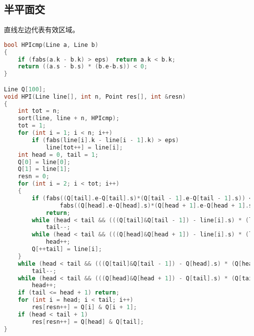 \subsection{半平面交}
	直线左边代表有效区域。
	\begin{lstlisting}[language=c++]
bool HPIcmp(Line a, Line b)
{
	if (fabs(a.k - b.k) > eps)	return a.k < b.k;
	return ((a.s - b.s) * (b.e-b.s)) < 0;
}

Line Q[100];
void HPI(Line line[], int n, Point res[], int &resn)
{
	int tot = n;
	sort(line, line + n, HPIcmp);
	tot = 1;
	for (int i = 1; i < n; i++)
		if (fabs(line[i].k - line[i - 1].k) > eps)
			line[tot++] = line[i];
	int head = 0, tail = 1;
	Q[0] = line[0];
	Q[1] = line[1];
	resn = 0;
	for (int i = 2; i < tot; i++)
	{
		if (fabs((Q[tail].e-Q[tail].s)*(Q[tail - 1].e-Q[tail - 1].s)) < eps ||
				fabs((Q[head].e-Q[head].s)*(Q[head + 1].e-Q[head + 1].s)) < eps)
			return;
		while (head < tail && (((Q[tail]&Q[tail - 1]) - line[i].s) * (line[i].e-line[i].s)) > eps)
			tail--;
		while (head < tail && (((Q[head]&Q[head + 1]) - line[i].s) * (line[i].e-line[i].s)) > eps)
			head++;
		Q[++tail] = line[i];
	}
	while (head < tail && (((Q[tail]&Q[tail - 1]) - Q[head].s) * (Q[head].e-Q[head].s)) > eps)
		tail--;
	while (head < tail && (((Q[head]&Q[head + 1]) - Q[tail].s) * (Q[tail].e-Q[tail].s)) > eps)
		head++;
	if (tail <= head + 1) return;
	for (int i = head; i < tail; i++)
		res[resn++] = Q[i] & Q[i + 1];
	if (head < tail + 1)
		res[resn++] = Q[head] & Q[tail];
}
	\end{lstlisting}
